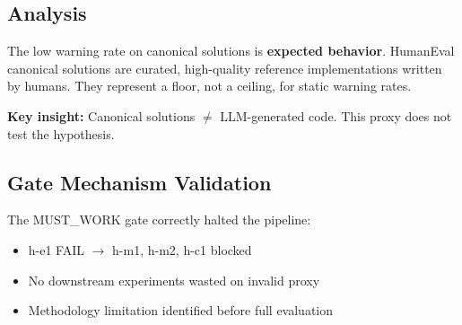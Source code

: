 \subsection{Analysis}

The low warning rate on canonical solutions is \textbf{expected behavior}. HumanEval canonical solutions are curated, high-quality reference implementations written by humans. They represent a floor, not a ceiling, for static warning rates.

\textbf{Key insight:} Canonical solutions $\neq$ LLM-generated code. This proxy does not test the hypothesis.

\subsection{Gate Mechanism Validation}

The MUST\_WORK gate correctly halted the pipeline:
\begin{itemize}
    \item h-e1 FAIL $\rightarrow$ h-m1, h-m2, h-c1 blocked
    \item No downstream experiments wasted on invalid proxy
    \item Methodology limitation identified before full evaluation
\end{itemize}
